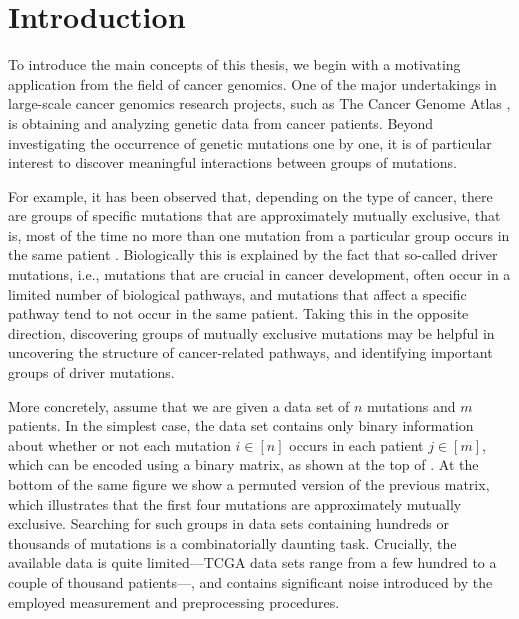 \chapter{Introduction} \label{ch:intro}
To introduce the main concepts of this thesis, we begin with a motivating application from the field of cancer genomics.
One of the major undertakings in large-scale cancer genomics research projects, such as The Cancer Genome Atlas \citep{tcga}, is obtaining and analyzing genetic data from cancer patients.
Beyond investigating the occurrence of genetic mutations one by one, it is of particular interest to discover meaningful interactions between groups of mutations.

For example, it has been observed that, depending on the type of cancer, there are groups of specific mutations that are approximately mutually exclusive, that is, most of the time no more than one mutation from a particular group occurs in the same patient \citep{yeang08}.
Biologically this is explained by the fact that so-called driver mutations, i.e., mutations that are crucial in cancer development, often occur in a limited number of biological pathways, and mutations that affect a specific pathway tend to not occur in the same patient.
Taking this in the opposite direction, discovering groups of mutually exclusive mutations may be helpful in uncovering the structure of cancer-related pathways, and identifying important groups of driver mutations.

More concretely, assume that we are given a data set of $n$ mutations and $m$ patients.
In the simplest case, the data set contains only binary information about whether or not each mutation $i \in [n]$ occurs in each patient $j \in [m]$, which can be encoded using a binary matrix, as shown at the top of .
At the bottom of the same figure we show a permuted version of the previous matrix, which illustrates that the first four mutations are approximately mutually exclusive.
Searching for such groups in data sets containing hundreds or thousands of mutations is a combinatorially daunting task.
Crucially, the available data is quite limited---TCGA data sets range from a few hundred to a couple of thousand patients---, and contains significant noise introduced by the employed measurement and preprocessing procedures.


